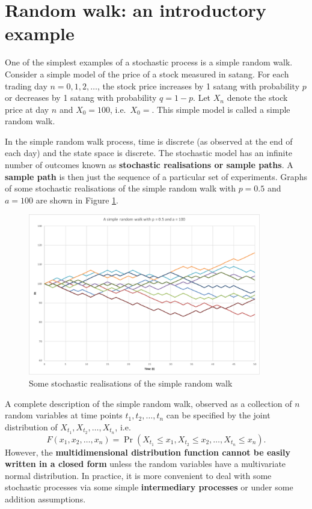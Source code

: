 \documentclass[
]{book}
\theoremstyle{definition}
\theoremstyle{definition}
\theoremstyle{definition}
\theoremstyle{definition}
\theoremstyle{remark}
\begin{document}
\hypertarget{random-walk-an-introductory-example}{%
\section{Random walk: an introductory example}\label{random-walk-an-introductory-example}}

One of the simplest examples of a stochastic process is a simple random
walk. Consider a simple model of the price of a stock measured in
satang. For each trading day \(n = 0,1,2, \ldots\), the stock price
increases by 1 satang with probability \(p\) or decreases by 1 satang with
probability \(q = 1-p\). Let \(X_n\) denote the stock price at day \(n\) and
\(X_0 = 100\), i.e.~\(X_0 =\). This simple model is called a simple random
walk.

In the simple random walk process, time is discrete (as observed at the
end of each day) and the state space is discrete. The stochastic model
has an infinite number of outcomes known as \textbf{stochastic realisations or
sample paths}. A \textbf{sample path} is then just the sequence of a
particular set of experiments. Graphs of some stochastic realisations of
the simple random walk with \(p = 0.5\) and \(a = 100\) are shown in Figure
\protect\hyperlink{fig:SamplePaths}{1}.

\begin{figure}
\hypertarget{fig:SamplePaths}{%
\centering
\includegraphics[width=4in,height=\textheight]{SamplePaths.pdf}
\caption{Some stochastic realisations of the simple random
walk}\label{fig:SamplePaths}
}
\end{figure}

A complete description of the simple random walk, observed as a
collection of \(n\) random variables at time points
\(t_1, t_2, \ldots, t_n\) can be specified by the joint distribution of
\(X_{t_1}, X_{t_2}, \ldots, X_{t_n}\), i.e.
\[F(x_1, x_2, \ldots, x_n) = \Pr(X_{t_1} \le x_1, X_{t_2} \le x_2, \ldots, X_{t_n} \le x_n).\]
However, the \textbf{multidimensional distribution function cannot be easily
written in a closed form} unless the random variables have a
multivariate normal distribution. In practice, it is more convenient to
deal with some stochastic processes via some simple \textbf{intermediary
processes} or under some addition assumptions.
\end{document}
